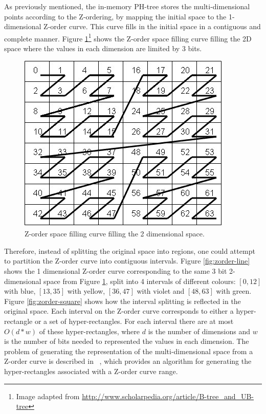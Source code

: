 \documentclass[11pt,a4paper]{globis-book}
\begin{document}
As previously mentioned, the in-memory PH-tree stores the multi-dimensional points according to the Z-ordering, by mapping the initial space to the 1-dimensional Z-order curve. This curve fills in the initial space in a contiguous and complete manner. Figure \ref{fig:zordering-clear}\footnote{Image adapted from \url{http://www.scholarpedia.org/article/B-tree_and_UB-tree}} shows the Z-order space filling curve filling the 2D space where the values in each dimension are limited by 3 bits.  

\begin{figure}[t]
    \centering
    \includegraphics[scale=0.8]{images/zordering-clear}
    \caption{Z-order space filling curve filling the 2 dimensional space.}
    \label{fig:zordering-clear}
\end{figure}

Therefore, instead of splitting the original space into regions, one could attempt to partition the Z-order curve into contiguous intervals. Figure \ref{fig:zorder-line} shows the 1 dimensional Z-order curve corresponding to the same 3 bit 2-dimensional space from Figure \ref{fig:zordering-clear}, split into 4 intervals of different colours: $[{0, 12}]$ with blue, $[13, 35]$ with yellow, $[36, 47]$ with violet and $[48, 63]$ with green. Figure \ref{fig:zorder-square} shows how the interval splitting is reflected in the original space. Each interval on the Z-order curve corresponds to either a hyper-rectangle or a set of hyper-rectangles. For each interval there are at most $O(d*w)$ of these hyper-rectangles, where $d$ is the number of dimensions and $w$ is the number of bits needed to represented the values in each dimension. The problem of generating the representation of the multi-dimensional space from a Z-order curve is described in ~\cite{skopal2006-ubtree}, which provides an algorithm for generating the hyper-rectangles associated with a Z-order curve range.
\end{document}
